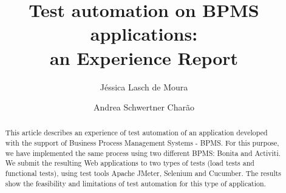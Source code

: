 \documentclass[runningheads,a4paper]{llncs}
\newcommand{\keywords}[1]{\par\addvspace\baselineskip
\noindent\keywordname\enspace\ignorespaces#1}
\begin{document}
\mainmatter  %

\title{
Test automation on BPMS applications: \\ an Experience Report}


%
%
\author{Jéssica Lasch de Moura
\and Andrea Schwertner Charão}
%


%
%

\maketitle


\begin{abstract}
This article describes an experience of test automation of an application developed with the support of Business Process Management Systems - BPMS. For this purpose, we have implemented the same process using two different BPMS: Bonita and Activiti. We submit the resulting Web applications to two types of tests (load tests and functional tests), using test tools Apache JMeter, Selenium and Cucumber. The results show the feasibility and limitations of test automation for this type of application.

\end{abstract}
\end{document}
